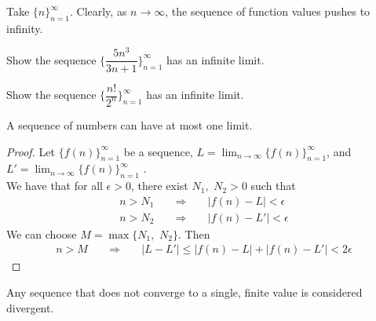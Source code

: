 \begin{example}
Take $\{n\}_{n=1}^{\infty}$. Clearly, as $n \longrightarrow \infty$, the sequence of function values pushes to infinity.
\end{example}

\begin{exercise}
Show the sequence $\Big\{\dfrac{5n^{3}}{3n+1}\Big\}_{n=1}^{\infty}$ has an infinite limit. 
\end{exercise}

\begin{exercise}
Show the sequence $\Big\{\dfrac{n!}{2^{n}}\Big\}_{n=1}^{\infty}$ has an infinite limit. 
\end{exercise}

\begin{theorem}
A sequence of numbers can have at most one limit.
\begin{proof}
    Let $\{f(n)\}_{n=1}^{\infty}$ be a sequence, $L = \lim_{n \longrightarrow \infty} \{f(n)\}_{n=1}^{\infty}$, and $L' = \lim_{n \longrightarrow \infty} \{f(n)\}_{n=1}^{\infty}$ .\\
    We have that for all $\epsilon > 0$, there exist $N_{1}, \hspace{4pt} N_{2} > 0$ such that
    \begin{align*}
        n > N_{1} \hspace{20pt} \Longrightarrow \hspace{20pt} \lvert f(n) - L \rvert < \epsilon \\[2ex]
        n > N_{2} \hspace{20pt} \Longrightarrow \hspace{20pt} \lvert f(n) - L' \rvert < \epsilon
    \end{align*}
    We can choose $M = \max\{N_1, \hspace{4pt} N_{2}\}$. Then
    \begin{align*}
        n > M \hspace{20pt} \Longrightarrow \hspace{20pt} \lvert L - L' \rvert \leq \lvert f(n) - L \rvert + \lvert f(n) - L' \rvert < 2\epsilon
    \end{align*}
\end{proof}
\label{limit_uniqueness}
\end{theorem}

\begin{note}
Any sequence that does not converge to a single, finite value is considered divergent.
\end{note}

